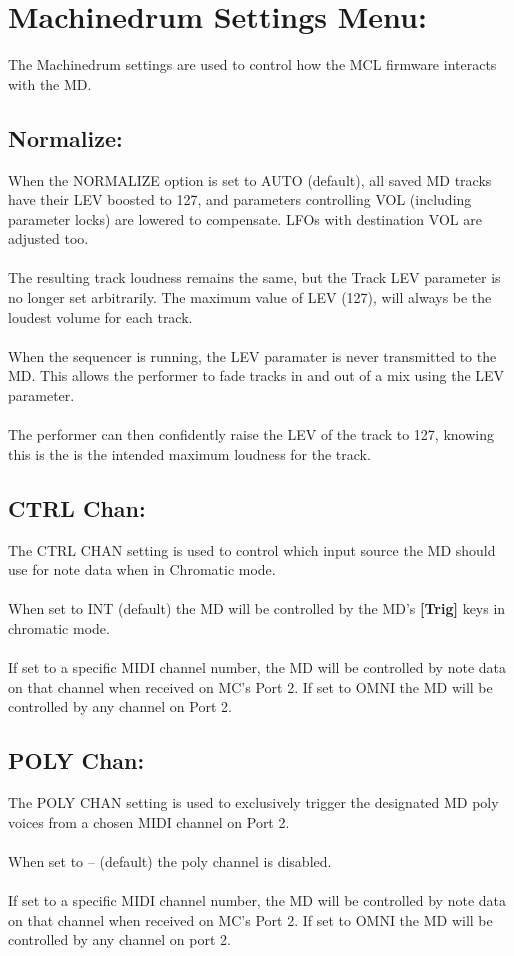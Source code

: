 \chapter{Machinedrum Settings Menu:}
The Machinedrum settings are used to control how the MCL firmware interacts with the MD.
\section{Normalize:}

When the NORMALIZE option is set to AUTO (default), all saved MD tracks have their LEV boosted to 127, and parameters controlling VOL (including parameter locks) are lowered
to compensate. LFOs with destination VOL are 
adjusted too.\\
\\
The resulting track loudness remains the same, but the Track LEV parameter is no longer set arbitrarily. The maximum value of LEV (127), will always be the loudest volume for each track.\\
\\
When the sequencer is running, the LEV paramater is never transmitted to the MD. This allows the performer to fade tracks in and out of a mix using the LEV parameter.\\
\\
The performer can then confidently raise the LEV of the track to 127, knowing this is the is the intended maximum loudness for the track.
\section{CTRL Chan:}
The CTRL CHAN setting is used to control which input source the MD should use for note data when in Chromatic mode.
\\\\
When set to INT (default) the MD will be controlled by the MD's \textbf{[Trig]} keys in chromatic mode.
\\\\
If set to a specific MIDI channel number, the MD will be controlled by note data on that channel when received on MC's Port 2. If set to OMNI the MD will be controlled by any channel on Port 2.
\newpage
\section{POLY Chan:}
The POLY CHAN setting is used to exclusively trigger the designated MD poly voices from a chosen MIDI channel on Port 2.
\\\\
When set to -- (default) the poly channel is disabled.
\\\\
If set to a specific MIDI channel number, the MD will be controlled by note data on that channel when received on MC's Port 2. If set to OMNI the MD will be controlled by any channel on port 2.
